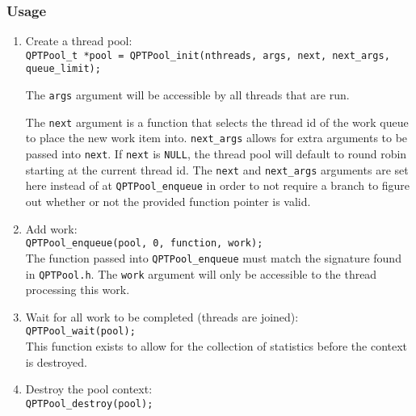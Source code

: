\subsubsection{Usage}
\begin{enumerate}
\item Create a thread pool: \\ \texttt{QPTPool\_t *pool =
  QPTPool\_init(nthreads, args, next, next\_args, queue\_limit);}

  The \texttt{args} argument will be accessible by all threads that
  are run.

  The \texttt{next} argument is a function that selects the
  thread id of the work queue to place the new work item
  into. \texttt{next\_args} allows for extra arguments to be passed
  into \texttt{next}. If \texttt{next} is \texttt{NULL}, the thread
  pool will default to round robin starting at the current thread
  id. The \texttt{next} and \texttt{next\_args} arguments are set here
  instead of at \texttt{QPTPool\_enqueue} in order to not require a
  branch to figure out whether or not the provided function pointer is
  valid.

\item Add work: \\ \texttt{QPTPool\_enqueue(pool, 0, function,
  work);} \\ The function passed into \texttt{QPTPool\_enqueue} must
  match the signature found in \texttt{QPTPool.h}. The \texttt{work}
  argument will only be accessible to the thread processing this work.

\item Wait for all work to be completed (threads are joined):
  \\ \texttt{QPTPool\_wait(pool);} \\ This function exists to allow
  for the collection of statistics before the context is destroyed.

\item Destroy the pool context: \\ \texttt{QPTPool\_destroy(pool);}
\end{enumerate}
